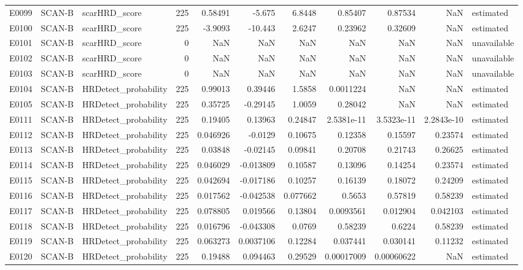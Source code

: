 \begin{longtable}{lllrrrrrrrl}
E0099 & SCAN-B & scarHRD\_score & 225 & 0.58491 & -5.675 & 6.8448 & 0.85407 & 0.87534 & NaN & estimated \\
E0100 & SCAN-B & scarHRD\_score & 225 & -3.9093 & -10.443 & 2.6247 & 0.23962 & 0.32609 & NaN & estimated \\
E0101 & SCAN-B & scarHRD\_score & 0 & NaN & NaN & NaN & NaN & NaN & NaN & unavailable \\
E0102 & SCAN-B & scarHRD\_score & 0 & NaN & NaN & NaN & NaN & NaN & NaN & unavailable \\
E0103 & SCAN-B & scarHRD\_score & 0 & NaN & NaN & NaN & NaN & NaN & NaN & unavailable \\
E0104 & SCAN-B & HRDetect\_probability & 225 & 0.99013 & 0.39446 & 1.5858 & 0.0011224 & NaN & NaN & estimated \\
E0105 & SCAN-B & HRDetect\_probability & 225 & 0.35725 & -0.29145 & 1.0059 & 0.28042 & NaN & NaN & estimated \\
E0111 & SCAN-B & HRDetect\_probability & 225 & 0.19405 & 0.13963 & 0.24847 & 2.5381e-11 & 3.5323e-11 & 2.2843e-10 & estimated \\
E0112 & SCAN-B & HRDetect\_probability & 225 & 0.046926 & -0.0129 & 0.10675 & 0.12358 & 0.15597 & 0.23574 & estimated \\
E0113 & SCAN-B & HRDetect\_probability & 225 & 0.03848 & -0.02145 & 0.09841 & 0.20708 & 0.21743 & 0.26625 & estimated \\
E0114 & SCAN-B & HRDetect\_probability & 225 & 0.046029 & -0.013809 & 0.10587 & 0.13096 & 0.14254 & 0.23574 & estimated \\
E0115 & SCAN-B & HRDetect\_probability & 225 & 0.042694 & -0.017186 & 0.10257 & 0.16139 & 0.18072 & 0.24209 & estimated \\
E0116 & SCAN-B & HRDetect\_probability & 225 & 0.017562 & -0.042538 & 0.077662 & 0.5653 & 0.57819 & 0.58239 & estimated \\
E0117 & SCAN-B & HRDetect\_probability & 225 & 0.078805 & 0.019566 & 0.13804 & 0.0093561 & 0.012904 & 0.042103 & estimated \\
E0118 & SCAN-B & HRDetect\_probability & 225 & 0.016796 & -0.043308 & 0.0769 & 0.58239 & 0.6224 & 0.58239 & estimated \\
E0119 & SCAN-B & HRDetect\_probability & 225 & 0.063273 & 0.0037106 & 0.12284 & 0.037441 & 0.030141 & 0.11232 & estimated \\
E0120 & SCAN-B & HRDetect\_probability & 225 & 0.19488 & 0.094463 & 0.29529 & 0.00017009 & 0.00060622 & NaN & estimated \\

\end{longtable}
